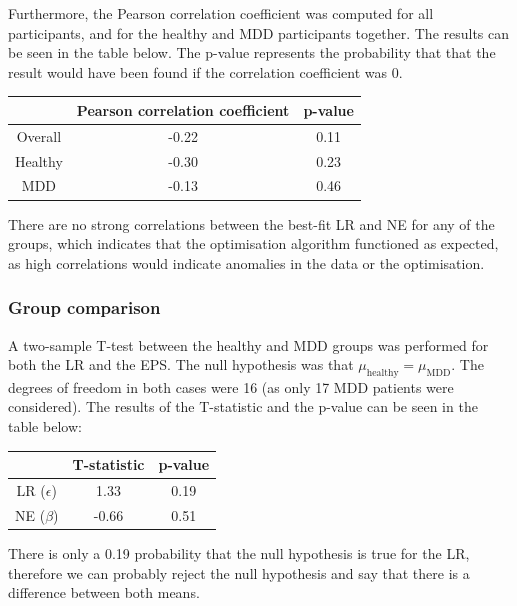 \documentclass[12pt]{article}
\begin{document}
Furthermore, the Pearson correlation coefficient was computed for all participants, and for the healthy and MDD participants together. The results can be seen in the table below. The p-value represents the probability that that the result would have been found if the correlation coefficient was 0.

\begin{center}
 \begin{tabular}{|c || c | c |} 
 \hline
  & Pearson correlation coefficient & p-value  \\ [0.5ex] 
 \hline\hline
 Overall & -0.22 & 0.11 \\ 
 \hline
 Healthy & -0.30 & 0.23 \\
 \hline
 MDD & -0.13 & 0.46 \\ [1ex] 
 \hline
\end{tabular}
\end{center}

There are no strong correlations between the best-fit LR and NE for any of the groups, which indicates that the optimisation algorithm functioned as expected, as high correlations would indicate anomalies in the data or the optimisation. 

\subsubsection{Group comparison}
\label{sec:t-model-0}
A two-sample T-test between the healthy and MDD groups was performed for both the LR and the EPS. The null hypothesis was that $\mu_{\mathrm{healthy}} = \mu_{\mathrm{MDD}}$. The degrees of freedom in both cases were 16 (as only 17 MDD patients were considered). The results of the T-statistic and the p-value can be seen in the table below:

\begin{center}
 \begin{tabular}{|c || c | c |} 
 \hline
  & T-statistic & p-value  \\ [0.5ex] 
 \hline\hline
 LR ($\epsilon$) & 1.33 & 0.19 \\
 \hline
 NE ($\beta$) & -0.66 & 0.51 \\ [1ex] 
 \hline
\end{tabular}
\end{center}

There is only a 0.19 probability that the null hypothesis is true for the LR, therefore we can probably reject the null hypothesis and say that there is a difference between both means.
\end{document}
